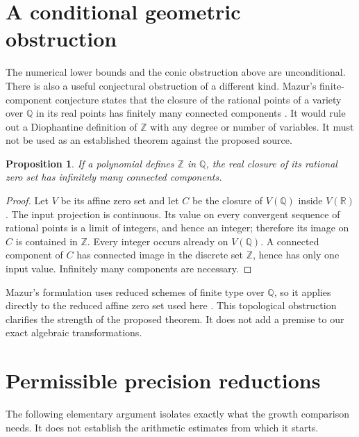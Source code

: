 \documentclass[11pt]{article}
\newtheorem{proposition}[theorem]{Proposition}
\theoremstyle{definition}
\newcommand{\Q}{\mathbb Q}
\newcommand{\Z}{\mathbb Z}
\begin{document}
\section{A conditional geometric obstruction}
\label{sec:mazur}

The numerical lower bounds and the conic obstruction above are
unconditional. There is also a useful
conjectural obstruction of a different kind. Mazur's finite-component
conjecture states that the closure of the rational points of a variety
over $\Q$ in its real points has finitely many connected components
\cite[Conjecture 3]{Mazur1995}. It would rule out a Diophantine
definition of $\Z$ with any degree or number of variables. It must
not be used as an established theorem against the proposed source.

\begin{proposition}
If a polynomial defines $\Z$ in $\Q$, the real closure of its rational
zero set has infinitely many connected components.
\end{proposition}
\begin{proof}
Let $V$ be its affine zero set and let $C$ be the closure of $V(\Q)$
inside $V(\mathbb R)$. The input projection is continuous. Its value
on every convergent sequence of rational points is a limit of integers,
and hence an integer; therefore its image on $C$ is contained in $\Z$.
Every integer occurs already on $V(\Q)$. A connected component of
$C$ has connected image in the discrete set $\Z$, hence has only one
input value. Infinitely many components are necessary.
\end{proof}

Mazur's formulation uses reduced schemes of finite type over $\Q$,
so it applies directly to the reduced affine zero set used here
\cite[Section 1 and Conjecture 3]{Mazur1995}. This topological obstruction
clarifies the strength of the proposed theorem. It does not add a
premise to our exact algebraic transformations.


\appendix
\section{Permissible precision reductions}

The following elementary argument isolates exactly what the growth
comparison needs. It does not establish the arithmetic estimates from
which it starts.
\end{document}
